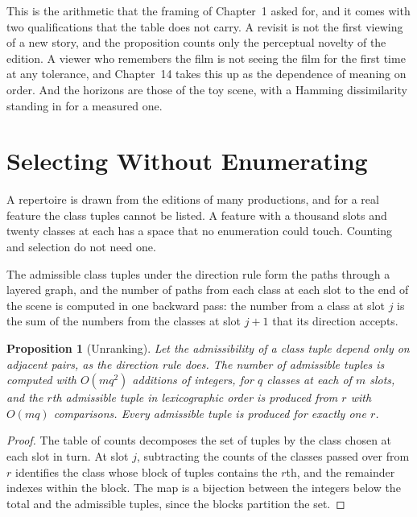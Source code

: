 \documentclass[11pt,twoside,openright]{book}
\theoremstyle{plain}
\newtheorem{proposition}[theorem]{Proposition}
\theoremstyle{definition}
\theoremstyle{remark}
\begin{document}
This is the arithmetic that the framing of Chapter~1 asked for, and it comes with two qualifications that the table does not carry. A revisit is not the first viewing of a new story, and the proposition counts only the perceptual novelty of the edition. A viewer who remembers the film is not seeing the film for the first time at any tolerance, and Chapter~14 takes this up as the dependence of meaning on order. And the horizons are those of the toy scene, with a Hamming dissimilarity standing in for a measured one.

\section{Selecting Without Enumerating}\label{sec:select13}

A repertoire is drawn from the editions of many productions, and for a real feature the class tuples cannot be listed. A feature with a thousand slots and twenty classes at each has a space that no enumeration could touch. Counting and selection do not need one.

The admissible class tuples under the direction rule form the paths through a layered graph, and the number of paths from each class at each slot to the end of the scene is computed in one backward pass: the number from a class at slot $j$ is the sum of the numbers from the classes at slot $j+1$ that its direction accepts.

\begin{proposition}[Unranking]\label{prop:unrank}
Let the admissibility of a class tuple depend only on adjacent pairs, as the direction rule does. The number of admissible tuples is computed with $O(mq^2)$ additions of integers, for $q$ classes at each of $m$ slots, and the $r$th admissible tuple in lexicographic order is produced from $r$ with $O(mq)$ comparisons. Every admissible tuple is produced for exactly one $r$.
\end{proposition}

\begin{proof}
The table of counts decomposes the set of tuples by the class chosen at each slot in turn. At slot $j$, subtracting the counts of the classes passed over from $r$ identifies the class whose block of tuples contains the $r$th, and the remainder indexes within the block. The map is a bijection between the integers below the total and the admissible tuples, since the blocks partition the set.
\end{proof}
\end{document}
